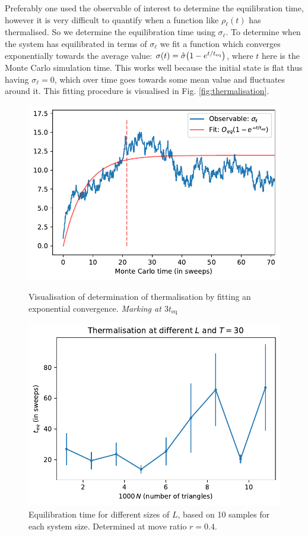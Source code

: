 Preferably one used the observable of interest to determine the equilibration time, however it is very difficult to quantify when a function like $\rho_\ell(t)$ has thermalised. So we determine the equilibration time using $\sigma_\ell$.
To determine when the system has equilibrated in terms of $\sigma_\ell$ we fit a function which converges exponentially towards the average value:
$\sigma(t) = \hat\sigma \qty(1 - e^{t/t_\text{eq}})$, where $t$ here is the Monte Carlo simulation time.
This works well because the initial state is flat thus having $\sigma_\ell = 0$, which over time goes towards some mean value and fluctuates around it.
This fitting procedure is visualised in Fig. \ref{fig:thermalisation}.
\begin{figure}[ht]
    \centering
    \begin{minipage}[t]{0.47\linewidth}
        \centering
        \includegraphics[width=0.95\linewidth]{img/teq_thermalisation.pdf}
        \caption{Visualisation of determination of thermalisation by fitting an exponential convergence. \textit{Marking at $3t_\text{eq}$}}
        \label{fig:thermalisation}
    \end{minipage}
    \hfill
    \begin{minipage}[t]{0.48\linewidth}
        \centering
        \includegraphics[width=0.95\linewidth]{img/teq-Ldep.pdf}
        \caption{Equilibration time for different sizes of $L$, based on 10 samples for each system size. Determined at move ratio $r=0.4$.}
        \label{fig:teq_Ldep}
    \end{minipage}
\end{figure}

